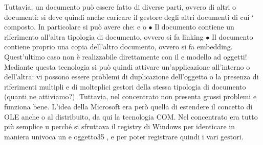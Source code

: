 \documentclass[a4paper,12pt]{article}
\begin{document}
Tuttavia, un documento può essere fatto di diverse parti, ovvero di altri
o
documenti: si deve quindi anche caricare il gestore degli altri documenti di cui
` composto. In particolare si può avere che:
e
o
$\bullet$ Il documento contiene un riferimento all'altra tipologia di documento,
ovvero si fa linking
$\bullet$ Il documento contiene proprio una copia dell'altro documento, ovvero si
fa embedding. Quest'ultimo caso non è realizzabile direttamente con il
e
modello ad oggetti!
Mediante questa tecnologia si può quindi attivare un'applicazione all'interno
o
dell'altra: vi possono essere problemi di duplicazione dell'oggetto o la presenza
di riferimenti multipli e di molteplici gestori della stessa tipologia di documento
(quanti ne attiviamo?). Tuttavia, nel concentrato non presenta grossi problemi
e funziona bene.
L'idea della Microsoft era però quella di estendere il concetto di OLE anche
o
al distribuito, da qui la tecnologia COM. Nel concentrato era tutto più semplice
u
perché si sfruttava il registry di Windows per identicare in maniera univoca un
e
oggetto35 , e per poter registrare quindi i vari gestori.
\end{document}
